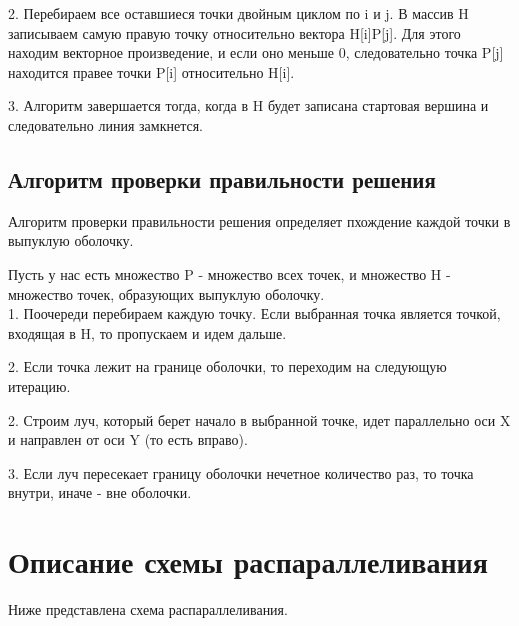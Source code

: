 \documentclass[a4paper, 12pt]{article}
\begin{document}
2. Перебираем все оставшиеся точки двойным циклом по {i} и {j}. В массив H записываем самую правую точку относительно вектора {H[i]P[j]}. Для этого находим векторное произведение, и если оно меньше 0, следовательно точка {P[j]} находится правее точки {P[i]} относительно {H[i]}.

3. Алгоритм завершается тогда, когда в {H} будет записана стартовая вершина и следовательно линия замкнется.

\subsection{Алгоритм проверки правильности решения}

Алгоритм проверки правильности решения определяет пхождение каждой точки в выпуклую оболочку.

Пусть у нас есть множество {P} - множество всех точек, и множество {H} - множество точек, образующих выпуклую оболочку.\\[2mm]

1. Поочереди перебираем каждую точку. Если выбранная точка является точкой, входящая в {H}, то пропускаем и идем дальше.

2. Если точка лежит на границе оболочки, то переходим на следующую итерацию.

2. Строим луч, который берет начало в выбранной точке, идет параллельно оси {X} и направлен от оси {Y} (то есть вправо).

3. Если луч пересекает границу оболочки нечетное количество раз, то точка внутри, иначе - вне оболочки.

\newpage
\section{Описание схемы распараллеливания}

Ниже представлена схема распараллеливания.
\end{document}
